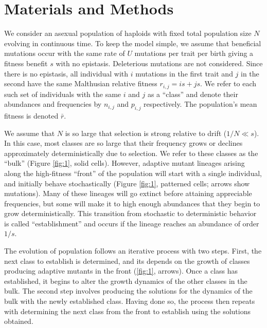 \documentclass[9pt,twocolumn,twoside]{gsajnl}
\begin{document}
\section{Materials and Methods}
\label{sec:materials:methods}

We consider an asexual population of haploids with fixed total population size $N$ evolving in continuous time. To keep the model simple, we assume that beneficial mutations occur with the same rate of $U$ mutations per trait per birth giving a fitness benefit $s$ with no epistasis. Deleterious mutations are not considered. Since there is no epistasis, all individual with $i$ mutations in the first trait and $j$ in the second have the same Malthusian relative fitness $r_{i,j}= i s+j s$. We refer to each such set of individuals with the same $i$ and $j$ as a ``class'' and denote their abundances and frequencies by $n_{i,j}$ and $p_{i,j}$ respectively. The population's mean fitness is denoted $\bar{r}$.   

We assume that $N$ is so large that selection is strong relative to drift ($1/N \ll s$). In this case, most classes are so large that their frequency grows or declines approximately deterministically due to selection. We refer to these classes as the ``bulk''  (Figure \ref{fig:1}, solid cells). However, adaptive mutant lineages arising along the high-fitness ``front'' of the population will start with a single individual, and initially behave stochastically (Figure \ref{fig:1}, patterned cells; arrows show mutations). Many of these lineages will go extinct before attaining appreciable frequencies, but some will make it to high enough abundances that they begin to grow deterministically. This transition from stochastic to deterministic behavior is called ``establishment'' and occurs if the lineage reaches an abundance of order $1/s$.  \par

The evolution of population follows an iterative process with two steps. First, the next class to establish is determined, and its depends on the growth of classes producing adaptive mutants in the front (\ref{fig:1}, arrows). Once a class has established, it begins to alter the growth dynamics of the other classes in the bulk. The second step involves producing the solutions for the dynamics of the bulk with the newly established class. Having done so, the process then repeats with determining the next class from the front to establish using the solutions obtained. 
\end{document}
